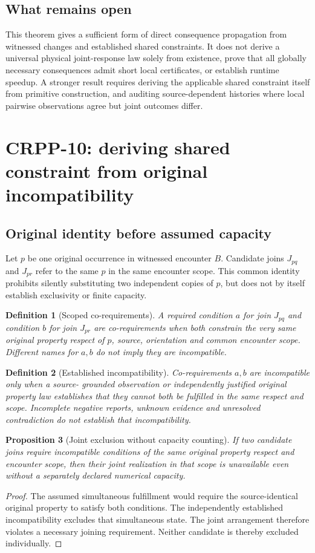 \documentclass[11pt]{article}
\newtheorem{definition}{Definition}[section]
\newtheorem{proposition}[definition]{Proposition}
\begin{document}
\subsection{What remains open}
This theorem gives a sufficient form of direct consequence
propagation from witnessed changes and established
shared constraints. It does not derive a universal
physical joint-response law solely from existence,
prove that all globally necessary consequences admit
short local certificates, or establish runtime speedup.
A stronger result requires deriving the applicable
shared constraint itself from primitive construction,
and auditing source-dependent histories where local
pairwise observations agree but joint outcomes differ.


\section{CRPP-10: deriving shared constraint from original incompatibility}
\label{sec:crpp10}
\subsection{Original identity before assumed capacity}
Let $p$ be one original occurrence in witnessed encounter $B$.
Candidate joins $J_{pq}$ and $J_{pr}$ refer to the same $p$
in the same encounter scope. This common identity prohibits
silently substituting two independent copies of $p$, but
does not by itself establish exclusivity or finite capacity.

\begin{definition}[Scoped co-requirements]
A required condition $a$ for join $J_{pq}$ and condition
$b$ for join $J_{pr}$ are \emph{co-requirements} when both
constrain the very same original property respect of $p$,
source, orientation and common encounter scope. Different
names for $a,b$ do not imply they are incompatible.
\end{definition}
\begin{definition}[Established incompatibility]
Co-requirements $a,b$ are incompatible only when a source-
grounded observation or independently justified original
property law establishes that they cannot both be fulfilled
in the same respect and scope. Incomplete negative reports,
unknown evidence and unresolved contradiction do not
establish that incompatibility.
\end{definition}

\begin{proposition}[Joint exclusion without capacity counting]
If two candidate joins require incompatible conditions
of the same original property respect and encounter scope,
then their joint realization in that scope is unavailable
even without a separately declared numerical capacity.
\end{proposition}
\begin{proof}
The assumed simultaneous fulfillment would require the
source-identical original property to satisfy both
conditions. The independently established incompatibility
excludes that simultaneous state. The joint arrangement
therefore violates a necessary joining requirement.
Neither candidate is thereby excluded individually.
\end{proof}
\end{document}
